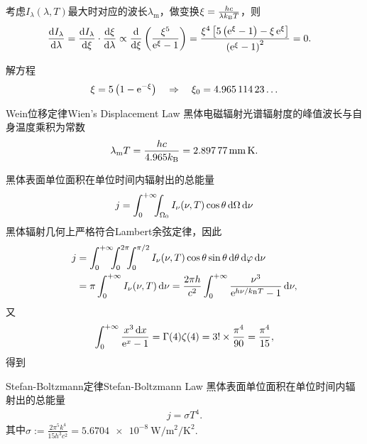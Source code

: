 考虑$I_\lambda(\lambda,T)$最大时对应的波长$\lambda_{\mathrm m}$，做变换$\xi=\frac{hc}{\lambda\kB T}$，则
\begin{align*}
	\dv{I_\lambda}\lambda & =\dv{I_\lambda}\xi\cdot\dv\xi\lambda\propto\dv{}\xi\kh{\frac{\xi^5}{\e\xi-1}}
	=\frac{\xi^4\fkh{5\kh{\e\xi-1}-\xi\e\xi}}{\kh{\e\xi-1}^2}=0.
\end{align*}
\iffalse
	\[
		\dv{I_\lambda}\lambda=\frac c4\cdot\frac{8\pi}{3c^3}\cdot\dv{}\lambda\kh{\frac{h\nu}{\e{h\nu/\kB T}-1}\cdot\dv{}\lambda\nu^3}.
\]
	由
	\[
		\dv{}\lambda=\dv{}\nu\cdot\dv\nu\lambda=-\frac c{\lambda^2}\dv{}\nu=-\frac{\nu^2}c\dv{}\nu.
\]
	故
	\begin{align*}
		\dv r\lambda & =\frac{2h}{3c^2}\cdot\frac{\nu^2}{c}\cdot\dv{}\nu\kh{\frac{\nu}{\e{h\nu/\kB T}-1}\cdot\frac{\nu^2}c\cdot 3\nu^2} \\
		             & =\frac{2h\nu^2}{c^4}\cdot\dv{}\nu\frac{\nu^5}{\e{h\nu/\kB T}-1},
	\end{align*}
	设$\xi:=h\nu/\kB T$，则导数等价于
	\[
		\dv{}\xi\frac{\xi^5}{\e\xi-1}=\frac{\xi^4}{\kh{\e\xi-1}^2}\fkh{5\kh{\e\xi-1}-\xi\e\xi}=0.
\]
\fi
解方程
\[
	\xi=5\kh{1-\e{-\xi}}\thus\xi_0=\num{4.96511423}\ldots
\]
\begin{theorem}{Wein位移定律}{Wien's Displacement Law}
	黑体电磁辐射光谱辐射度的峰值波长与自身温度乘积为常数
	\begin{align}
		\lambda_\mathrm m T=\frac{hc}{4.965\kB}=\SI{2.89777}{\mm\K}.
	\end{align}
\end{theorem}
\iffalse
	let $x:=\frac{\lambda kT}{hc}$, then $\d\lambda=\frac{hc}{kT}\d x,\frac{2\pi hc^2}{\lambda^5}=\frac{2\pi k^5T^5}{h^4c^3}\frac1{x^5}$
	\begin{align*}
		\frac{\d r}{\d\lambda} & =\frac{kT}{hc}\frac{2\pi k^5T^5}{h^4c^3}\frac{\d}{\d x}\frac1{x^5(e^{1/x}-1)}     \\
		                       & =\frac{2\pi k^6T^6}{h^5c^4}\frac{5x^4(e^{1/x}-1)+x^3e^{1/x}}{x^{10}(e^{1/x}-1)^2} \\
		                       & =\frac{2\pi k^6T^6}{h^5c^4}\frac{5xe^{1/x}-5x+e^{1/x}}{x^7(e^{1/x}-1)^2}
	\end{align*}
\fi
黑体表面单位面积在单位时间内辐射出的总能量
\[
	j=\int\zti\bs5\int_{\Omega_0}I_\nu(\nu,T)\cos\theta\d\Omega\d\nu
\]
黑体辐射几何上严格符合Lambert余弦定律，因此
\begin{align*}
	j & =\int\zti\bs5\int_0^{2\pi}\bs5\int_0^{\pi/2}I_\nu(\nu,T)\cos\theta\sin\theta\d\theta\d\vf\d\nu \\
	  & =\pi\int\zti I_\nu(\nu,T)\d\nu=\frac{2\pi h}{c^2}\int\zti\frac{\nu^3}{\e{h\nu/\kB T}-1}\d\nu,
\end{align*}
又
\[
	\int\zti\frac{x^3\d x}{\e x-1}=\Gamma(4)\zeta(4)=3!\times\frac{\pi^4}{90}=\frac{\pi^4}{15},
\]
得到
\begin{theorem}{Stefan-Boltzmann定律}{Stefan-Boltzmann Law}
	黑体表面单位面积在单位时间内辐射出的总能量
	\begin{align}
		j=\sigma T^4.
	\end{align}
	其中$\sigma:=\frac{2\pi^5k^4}{15h^3c^2}=\SI{5.6704e-8}{\W\per\m\squared\per\K\squared}.$
\end{theorem}

